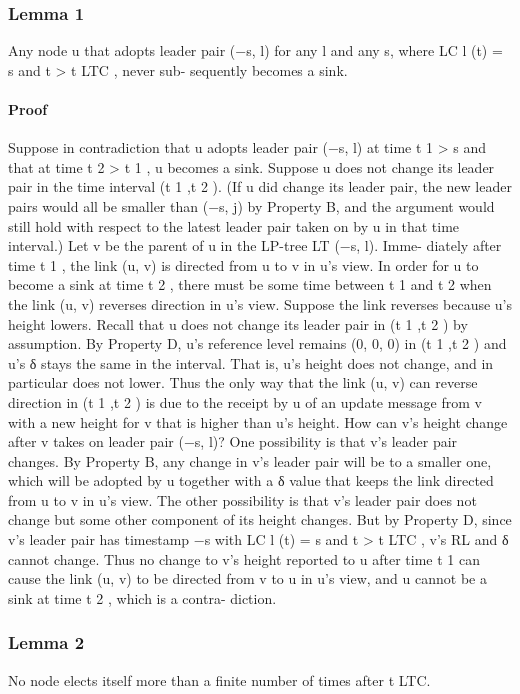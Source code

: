 \documentclass{article}
\begin{document}
\subsubsection{Lemma 1}
Any node u that adopts leader pair (−s, l) for
any l and any s, where LC l (t) = s and t > t LTC , never sub-
sequently becomes a sink.
\paragraph{Proof}
Suppose in contradiction that u adopts leader pair
(−s, l) at time t 1 > s and that at time t 2 > t 1 , u becomes
a sink. Suppose u does not change its leader pair in the
time interval (t 1 ,t 2 ). (If u did change its leader pair, the new
leader pairs would all be smaller than (−s, j) by Property B,
and the argument would still hold with respect to the latest
leader pair taken on by u in that time interval.)
Let v be the parent of u in the LP-tree LT (−s, l). Imme-
diately after time t 1 , the link (u, v) is directed from u to v in
u’s view.
In order for u to become a sink at time t 2 , there must be
some time between t 1 and t 2 when the link (u, v) reverses
direction in u’s view. Suppose the link reverses because
u’s height lowers. Recall that u does not change its leader
pair in (t 1 ,t 2 ) by assumption. By Property D, u’s reference
level remains (0, 0, 0) in (t 1 ,t 2 ) and u’s δ stays the same
in the interval. That is, u’s height does not change, and in
particular does not lower. Thus the only way that the link
(u, v) can reverse direction in (t 1 ,t 2 ) is due to the receipt by
u of an update message from v with a new height for v that
is higher than u’s height.
How can v’s height change after v takes on leader pair
(−s, l)? One possibility is that v’s leader pair changes. By
Property B, any change in v’s leader pair will be to a smaller
one, which will be adopted by u together with a δ value that
keeps the link directed from u to v in u’s view.
The other possibility is that v’s leader pair does not
change but some other component of its height changes. But
by Property D, since v’s leader pair has timestamp −s with
LC l (t) = s and t > t LTC , v’s RL and δ cannot change.
Thus no change to v’s height reported to u after time t 1
can cause the link (u, v) to be directed from v to u in u’s
view, and u cannot be a sink at time t 2 , which is a contra-
diction.



\subsubsection{Lemma 2}No node elects itself more than a finite number
of times after t LTC.
\end{document}
